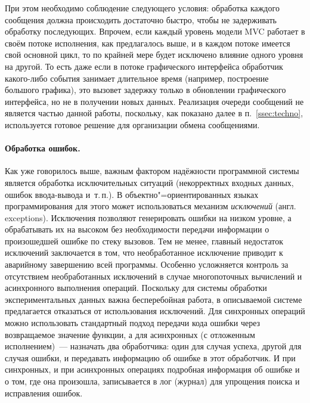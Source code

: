 \documentclass[a4paper, 14pt, titlepage]{extarticle}
\newcommand{\eng}[1]{\foreignlanguage{english}{#1}}
\newcommand{\term}[1]{\emph{#1}}
\let\oldparagraph\paragraph
\renewcommand{\paragraph}[1]{\oldparagraph{\indent #1}}
\begin{document}
  При этом необходимо соблюдение следующего условия: обработка каждого сообщения должна происходить
  достаточно быстро, чтобы не задерживать обработку
  последующих. Впрочем, если каждый уровень модели MVC работает в своём потоке исполнения, как
  предлагалось выше, и в каждом потоке имеется свой основной цикл, то по крайней мере будет
  исключено влияние одного уровня на другой. То есть даже если в потоке графического интерфейса
  обработчик какого-либо события занимает длительное время (например, построение большого графика),
  это вызовет задержку только в обновлении графического интерфейса, но не в получении новых данных.
  Реализация очереди сообщений не является частью данной работы, поскольку, как показано далее
  в п.~\ref{ssec:techno}, используется готовое решение для организации обмена сообщениями.

  \paragraph{Обработка ошибок.} Как уже говорилось выше, важным фактором надёжности программной
  системы является обработка исключительных ситуаций (некорректных входных данных, ошибок
  ввода-вывода и~т.\,п.). В объектно"=ориентированных языках программирования для этого может
  использоваться механизм \term{исключений} (англ. \eng{exceptions}).
  Исключения позволяют генерировать ошибки на низком уровне, а обрабатывать их на высоком без
  необходимости передачи информации о произошедшей ошибке по стеку вызовов.
  Тем не менее, главный недостаток исключений заключается в том, что необработанное исключение
  приводит к аварийному завершению всей программы. Особенно усложняется контроль за отсутствием
  необработанных исключений в случае многопоточных вычислений и асинхронного выполнения операций.
  Поскольку для системы обработки экспериментальных данных важна бесперебойная работа, в описываемой
  системе предлагается отказаться от использования исключений. Для синхронных операций можно
  использовать стандартный подход передачи кода ошибки через возвращаемое значение функции, а для
  асинхронных (с отложенным исполнением)~--- назначать два обработчика: один для случая успеха,
  другой для случая ошибки, и передавать информацию об ошибке в этот обработчик. И при синхронных, и
  при асинхронных операциях подробная информация об ошибке и о том, где она произошла, записывается в
  лог (журнал) для упрощения поиска и исправления ошибок.

\end{document}
